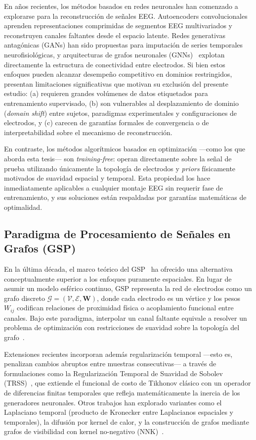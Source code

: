 En años recientes, los métodos basados en redes neuronales han comenzado a explorarse para la reconstrucción de señales EEG. Autoencoders convolucionales~\cite{banville2021uncovering} aprenden representaciones comprimidas de segmentos EEG multivariados y reconstruyen canales faltantes desde el espacio latente. Redes generativas antagónicas (GANs) han sido propuestas para imputación de series temporales neurofisiológicas, y arquitecturas de grafos neuronales (GNNs)~\cite{defferrard2016} explotan directamente la estructura de conectividad entre electrodos. Si bien estos enfoques pueden alcanzar desempeño competitivo en dominios restringidos, presentan limitaciones significativas que motivan su exclusión del presente estudio: (a) requieren grandes volúmenes de datos etiquetados para entrenamiento supervisado, (b) son vulnerables al desplazamiento de dominio (\textit{domain shift}) entre sujetos, paradigmas experimentales y configuraciones de electrodos, y (c) carecen de garantías formales de convergencia o de interpretabilidad sobre el mecanismo de reconstrucción.

En contraste, los métodos algorítmicos basados en optimización —como los que aborda esta tesis— son \textit{training-free}: operan directamente sobre la señal de prueba utilizando únicamente la topología de electrodos y \textit{priors} físicamente motivados de suavidad espacial y temporal. Esta propiedad los hace inmediatamente aplicables a cualquier montaje EEG sin requerir fase de entrenamiento, y sus soluciones están respaldadas por garantías matemáticas de optimalidad.

\subsection{Paradigma de Procesamiento de Señales en Grafos (GSP)}

En la última década, el marco teórico del GSP~\cite{shuman2013,ortega2018} ha ofrecido una alternativa conceptualmente superior a los enfoques puramente espaciales. En lugar de asumir un modelo esférico continuo, GSP representa la red de electrodos como un grafo discreto $\mathcal{G} = (\mathcal{V}, \mathcal{E}, \mathbf{W})$, donde cada electrodo es un vértice y los pesos $W_{ij}$ codifican relaciones de proximidad física o acoplamiento funcional entre canales. Bajo este paradigma, interpolar un canal faltante equivale a resolver un problema de optimización con restricciones de suavidad sobre la topología del grafo~\cite{narang2013,puy2018}.

Extensiones recientes incorporan además regularización temporal —esto es, penalizan cambios abruptos entre muestras consecutivas— a través de formulaciones como la Regularización Temporal de Suavidad de Sobolev (TRSS)~\cite{giraldo2022}, que extiende el funcional de costo de Tikhonov clásico con un operador de diferencias finitas temporales que refleja matemáticamente la inercia de los generadores neuronales. Otros trabajos han explorado variantes como el Laplaciano temporal (producto de Kronecker entre Laplacianos espaciales y temporales), la difusión por kernel de calor, y la construcción de grafos mediante grafos de visibilidad con kernel no-negativo (NNK)~\cite{bozkurt2022visibility}.

